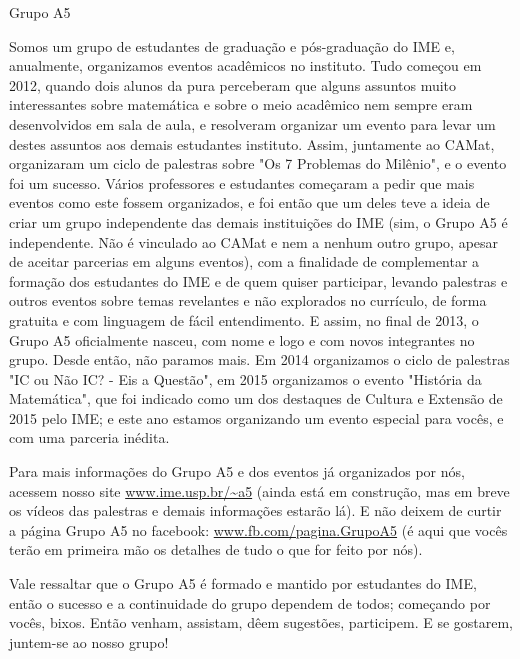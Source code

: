 \begin{subsecao}{Grupo A5}


Somos um grupo de estudantes de graduação e pós-graduação do IME e, anualmente,
organizamos eventos acadêmicos no instituto.  Tudo começou em 2012, quando dois
alunos da pura perceberam que alguns assuntos muito interessantes sobre
matemática e sobre o meio acadêmico nem sempre eram desenvolvidos em sala de
aula, e resolveram organizar um evento para levar um destes assuntos aos demais
estudantes instituto. Assim, juntamente ao CAMat, organizaram um ciclo de
palestras sobre "Os 7 Problemas do Milênio", e o evento foi um sucesso.  Vários
professores e estudantes começaram a pedir que mais eventos como este fossem
organizados, e foi então que um deles teve a ideia de criar um grupo
independente das demais instituições do IME (sim, o Grupo A5 é independente. Não
é vinculado ao CAMat e nem a nenhum outro grupo, apesar de aceitar parcerias em
alguns eventos), com a finalidade de complementar a formação dos estudantes do
IME e de quem quiser participar, levando palestras e outros eventos sobre temas
revelantes e não explorados no currículo, de forma gratuita e com linguagem de
fácil entendimento.  E assim, no final de 2013, o Grupo A5 oficialmente nasceu,
com nome e logo e com novos integrantes no grupo.  Desde então, não paramos
mais. Em 2014 organizamos o ciclo de palestras "IC ou Não IC? - Eis a Questão",
em 2015 organizamos o evento "História da Matemática", que foi indicado como um
dos destaques de Cultura e Extensão de 2015 pelo IME; e este ano estamos
organizando um evento especial para vocês, e com uma parceria inédita.


Para mais informações do Grupo A5 e dos eventos já organizados por nós, acessem
nosso site \url{www.ime.usp.br/~a5} (ainda está em construção, mas em breve os vídeos
das palestras e demais informações estarão lá).  E não deixem de curtir a página
Grupo A5 no facebook: \url{www.fb.com/pagina.GrupoA5} (é aqui que vocês terão em
primeira mão os detalhes de tudo o que for feito por nós).

Vale ressaltar que o Grupo A5 é formado e mantido por estudantes do IME, então o
sucesso e a continuidade do grupo dependem de todos; começando por vocês,
bixos. Então venham, assistam, dêem sugestões, participem. E se gostarem,
juntem-se ao nosso grupo!

\end{subsecao}
